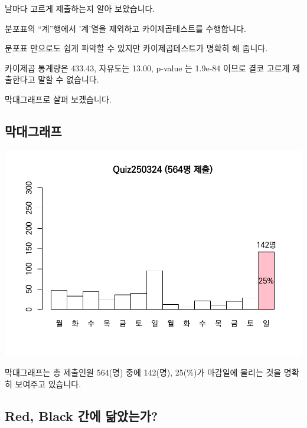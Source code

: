 \documentclass[
]{book}
\begin{document}
날마다 고르게 제출하는지 알아 보았습니다.

분포표의 ``계''행에서 '계'열을 제외하고 카이제곱테스트를 수행합니다.

분포표 만으로도 쉽게 파악할 수 있지만 카이제곱테스트가 명확히 해 줍니다.

카이제곱 통계량은 433.43, 자유도는 13.00, p-value 는 1.9e-84 이므로 결코 고르게 제출한다고 말할 수 없습니다.

막대그래프로 살펴 보겠습니다.

\subsection{막대그래프}\label{uxb9c9uxb300uxadf8uxb798uxd504-4}

\includegraphics{_main_files/figure-latex/unnamed-chunk-98-1.pdf}

막대그래프는 총 제출인원 564(명) 중에 142(명), 25(\%)가 마감일에 몰리는 것을 명확히 보여주고 있습니다.

\subsection{Red, Black 간에 닮았는가?}\label{red-black-uxac04uxc5d0-uxb2eeuxc558uxb294uxac00-3}
\end{document}
